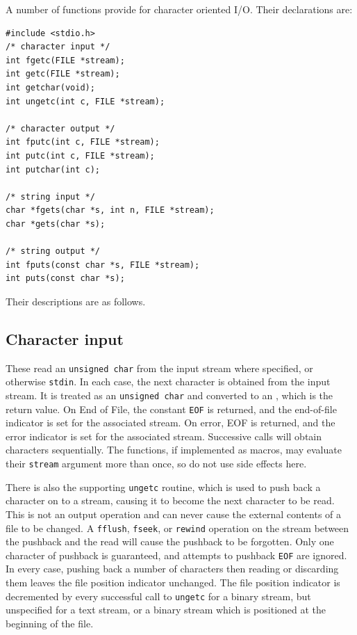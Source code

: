   

  A number of functions provide for character oriented I/O.
   Their declarations are:


  \begin{Verbatim}
#include <stdio.h>
/* character input */
int fgetc(FILE *stream);
int getc(FILE *stream);
int getchar(void);
int ungetc(int c, FILE *stream);

/* character output */
int fputc(int c, FILE *stream);
int putc(int c, FILE *stream);
int putchar(int c);

/* string input */
char *fgets(char *s, int n, FILE *stream);
char *gets(char *s);

/* string output */
int fputs(const char *s, FILE *stream);
int puts(const char *s);
\end{Verbatim}

  Their descriptions are as follows.


  \subsection{Character input}
   

   These read an \texttt{unsigned char} from the input stream where
    specified, or otherwise \texttt{stdin}.  In each case, the next
    character is obtained from the input stream.  It is treated as an
    \texttt{unsigned char} and converted to an \kint, which is
    the return value.  On End of File, the constant \texttt{EOF} is
    returned, and the end-of-file indicator is set for the associated stream.
    On error, EOF is returned, and the error indicator is set for the
    associated stream.  Successive calls will obtain characters sequentially.
    The functions, if implemented as macros, may evaluate their
    \texttt{stream} argument more than once, so do not use side effects
    here.


   There is also the supporting \texttt{ungetc} routine, which is used
    to push back a character on to a stream, causing it to become the next
    character to be read.  This is not an output operation and can never cause
    the external contents of a file to be changed.  A \texttt{fflush},
    \texttt{fseek}, or \texttt{rewind} operation on the stream between
    the pushback and the read will cause the pushback to be forgotten.  Only
    one character of pushback is guaranteed, and attempts to pushback
    \texttt{EOF} are ignored.  In every case, pushing back a number of
    characters then reading or discarding them leaves the file position
    indicator unchanged.  The file position indicator is decremented by every
    successful call to \texttt{ungetc} for a binary stream, but unspecified
    for a text stream, or a binary stream which is positioned at the beginning
    of the file.


